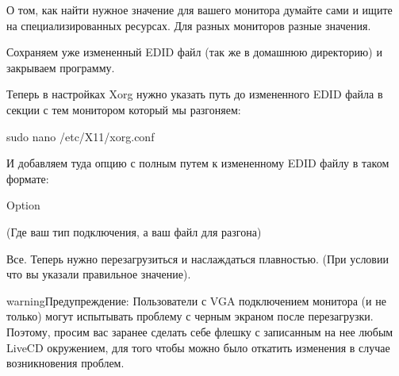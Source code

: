 \documentclass[letterpaper,10pt,russian,openany]{sphinxmanual}
\begin{document}
\noindent{}

\sphinxAtStartPar
О том, как найти нужное значение для вашего монитора \sphinxhyphen{} думайте сами и ищите на специализированных ресурсах.
Для разных мониторов \sphinxhyphen{} разные значения.

\sphinxAtStartPar
Сохраняем уже измененный EDID файл (так же в домашнюю директорию) и закрываем программу.

\noindent{}

\sphinxAtStartPar
Теперь в настройках Xorg нужно указать путь до измененного EDID файла в секции с тем монитором который мы разгоняем:

\begin{sphinxVerbatim}[commandchars=\\\{\}]
sudo nano /etc/X11/xorg.conf 
\end{sphinxVerbatim}

\sphinxAtStartPar
И добавляем туда опцию с полным путем к измененному EDID файлу в таком формате:

\begin{sphinxVerbatim}[commandchars=\\\{\}]
Option      
\end{sphinxVerbatim}

\sphinxAtStartPar
(Где  \sphinxhyphen{} ваш тип подключения, а  ваш файл для разгона)

\sphinxAtStartPar
Все. Теперь нужно перезагрузиться и наслаждаться плавностью.
(При условии что вы указали правильное значение).

\begin{sphinxadmonition}{warning}{Предупреждение:}
\sphinxAtStartPar
Пользователи с VGA подключением монитора (и не только) могут испытывать проблему с черным экраном после перезагрузки.
Поэтому, просим вас заранее сделать себе флешку с записанным на нее любым LiveCD окружением, для того чтобы можно было откатить изменения в случае возникновения проблем.
\end{sphinxadmonition}

\sphinxAtStartPar
{}

\sphinxAtStartPar
{}
\end{document}
